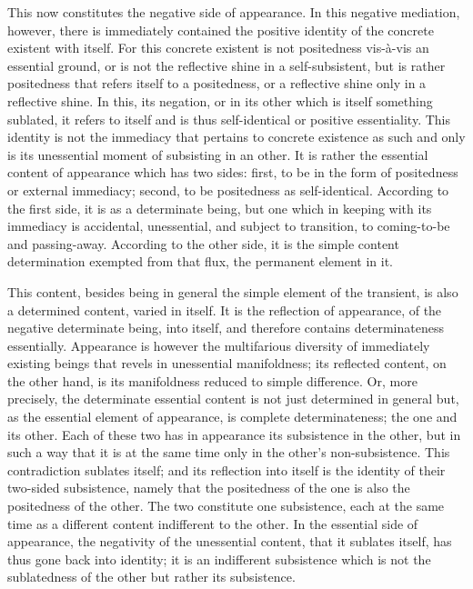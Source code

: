 This now constitutes the negative side of appearance.
In this negative mediation, however,
there is immediately contained the positive identity of
the concrete existent with itself.
For this concrete existent is not positedness
vis-à-vis an essential ground,
or is not the reflective shine in a self-subsistent,
but is rather positedness that refers itself to a positedness,
or a reflective shine only in a reflective shine.
In this, its negation, or in its other
which is itself something sublated,
it refers to itself and is thus
self-identical or positive essentiality.
This identity is not the immediacy
that pertains to concrete existence as such
and only is its unessential moment of subsisting in an other.
It is rather the essential content of appearance which has two sides:
first, to be in the form of positedness or external immediacy;
second, to be positedness as self-identical.
According to the first side, it is as a determinate being,
but one which in keeping with its immediacy is accidental, unessential,
and subject to transition, to coming-to-be and passing-away.
According to the other side, it is the simple content determination
exempted from that flux, the permanent element in it.

This content, besides being in general
the simple element of the transient,
is also a determined content, varied in itself.
It is the reflection of appearance,
of the negative determinate being, into itself,
and therefore contains determinateness essentially.
Appearance is however the multifarious diversity of
immediately existing beings that revels in unessential manifoldness;
its reflected content, on the other hand,
is its manifoldness reduced to simple difference.
Or, more precisely, the determinate essential content
is not just determined in general but,
as the essential element of appearance,
is complete determinateness;
the one and its other.
Each of these two has in appearance
its subsistence in the other,
but in such a way that it is at the same time
only in the other's non-subsistence.
This contradiction sublates itself;
and its reflection into itself is
the identity of their two-sided subsistence,
namely that the positedness of the one is
also the positedness of the other.
The two constitute one subsistence,
each at the same time as a different content
indifferent to the other.
In the essential side of appearance,
the negativity of the unessential content,
that it sublates itself, has thus gone back into identity;
it is an indifferent subsistence
which is not the sublatedness of the other
but rather its subsistence.

